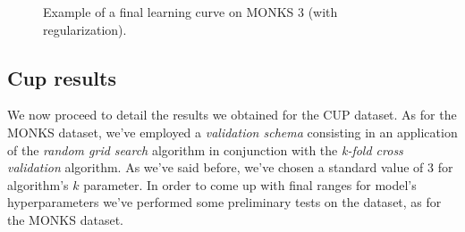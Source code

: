 \documentclass[11pt,twoside]{article}
\begin{document}
    \begin{figure}[htbp]
        \centering
        \begin{subfigure}{0.90\textwidth}
            \caption{}
            \label{fig:monks_3_MSE_reg}
        \end{subfigure}
        \begin{subfigure}{0.90\textwidth}
            \caption{}
            \label{fig:monks_3_ACC_reg}
        \end{subfigure}
        \caption{Example of a final learning curve on MONKS 3 (with regularization).}
        \label{fig:monks_3_final_results}
    \end{figure}


    \subsection{Cup results} %
    \label{sub:cup_results}
        We now proceed to detail the results we obtained for the CUP dataset. As for the MONKS dataset, we've
        employed a \textit{validation schema} consisting in an application of the \textit{random grid search}
        algorithm in conjunction with the \textit{k-fold cross validation} algorithm. As we've said before,
        we've chosen a standard value of $3$ for algorithm's $k$ parameter. In order to come up with final
        ranges for model's hyperparameters we've performed some preliminary tests on the dataset, as for the
        MONKS dataset.
\end{document}
